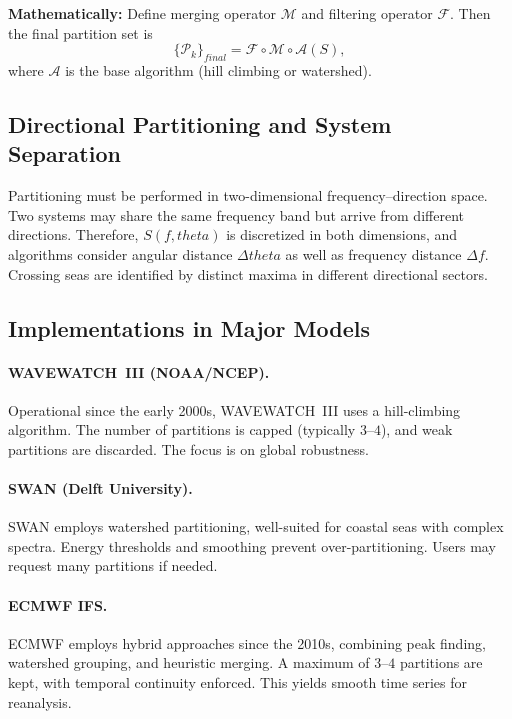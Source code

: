 \documentclass[journal,10pt,twocolumn]{IEEEtran}
\def\theta{theta}%
\def\text#1{#1}%
\begin{document}
    \textbf{Mathematically:} Define merging operator $\mathcal{M}$ and filtering operator $\mathcal{F}$. Then the final partition set is
    \[
        \{\mathcal{P}_k\}_{\text{final}} = \mathcal{F} \circ \mathcal{M} \circ \mathcal{A}(S),
    \]
    where $\mathcal{A}$ is the base algorithm (hill climbing or watershed).

    \subsection{Directional Partitioning and System Separation}
    Partitioning must be performed in two-dimensional frequency--direction space. Two systems may share the same frequency band but arrive from different directions. Therefore, $S(f,\theta)$ is discretized in both dimensions, and algorithms consider angular distance $\Delta\theta$ as well as frequency distance $\Delta f$. Crossing seas are identified by distinct maxima in different directional sectors.

    \subsection{Implementations in Major Models}
    \paragraph{WAVEWATCH~III (NOAA/NCEP).}
    Operational since the early 2000s, WAVEWATCH~III uses a hill-climbing algorithm. The number of partitions is capped (typically $3$--$4$), and weak partitions are discarded. The focus is on global robustness.

    \paragraph{SWAN (Delft University).}
    SWAN employs watershed partitioning, well-suited for coastal seas with complex spectra. Energy thresholds and smoothing prevent over-partitioning. Users may request many partitions if needed.

    \paragraph{ECMWF IFS.}
    ECMWF employs hybrid approaches since the 2010s, combining peak finding, watershed grouping, and heuristic merging. A maximum of $3$--$4$ partitions are kept, with temporal continuity enforced. This yields smooth time series for reanalysis.
\end{document}
